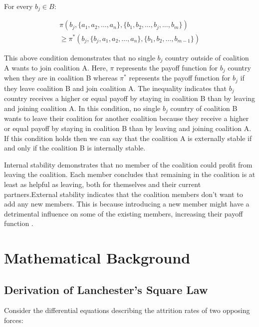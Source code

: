 \documentclass[oneside,12pt]{report}
\begin{document}
 For every $b_j \in B$:

\begin{equation}
\begin{split}
\pi\left(b_j, \{a_1, a_2, \ldots, a_n\}, \{b_1, b_2, \ldots, b_j, \ldots, b_m\}\right) \\
\geq \pi^*\left(b_j, \{b_j, a_1, a_2, \ldots, a_n\}, \{b_1, b_2, \ldots, b_{m-1}\}\right)
\end{split}
\end{equation}

This above condition demonstrates that no single \(b_j\) country outside of coalition A wants to join coalition A. Here, $\pi$ represents the payoff function for \(b_j\) country when they are in coalition B whereas $\pi^*$ represents the payoff function for \(b_j\) if they leave coalition B and join coalition A. The inequality indicates that \(b_j\) country receives a higher or equal payoff by staying in coalition B than by leaving and joining coalition A. In this condition, no single \(b_j\) country of coalition B wants to leave their coalition for another coalition because they receive a higher or equal payoff by staying in coalition B than by leaving and joining coalition A. If this condition holds then we can say that the coalition A is externally stable if and only if the coalition B is internally stable. 

Internal stability demonstrates that no member of the coalition could profit from leaving the coalition. Each member concludes that remaining in the coalition is at least as helpful as leaving, both for themselves and their current partners.External stability indicates that the coalition members don't want to add any new members. This is because introducing a new member might have a detrimental influence on some of the existing members, increasing their payoff function \cite{r7} .


\newpage

\section{Mathematical Background}

\subsection{Derivation of Lanchester's Square Law}

Consider the differential equations describing the attrition rates of two opposing forces:
\end{document}
